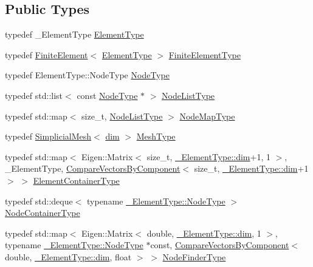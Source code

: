 \subsection*{Public Types}
\begin{DoxyCompactItemize}
\item 
typedef \+\_\+\+Element\+Type \hyperlink{classmodel_1_1_finite_element_ac75db3a0b957c14015dfa8f17ce5b4ac}{Element\+Type}
\item 
typedef \hyperlink{classmodel_1_1_finite_element}{Finite\+Element}$<$ \hyperlink{classmodel_1_1_finite_element_ac75db3a0b957c14015dfa8f17ce5b4ac}{Element\+Type} $>$ \hyperlink{classmodel_1_1_finite_element_a52dc23d4d24a1a38ff0f90d5708c02a8}{Finite\+Element\+Type}
\item 
typedef Element\+Type\+::\+Node\+Type \hyperlink{classmodel_1_1_finite_element_a050ffcafad7f62787f006bae60b7c7be}{Node\+Type}
\item 
typedef std\+::list$<$ const \hyperlink{classmodel_1_1_finite_element_a050ffcafad7f62787f006bae60b7c7be}{Node\+Type} $\ast$ $>$ \hyperlink{classmodel_1_1_finite_element_a7af9e72b3b309eacc0a939b164a67e0e}{Node\+List\+Type}
\item 
typedef std\+::map$<$ size\+\_\+t, \hyperlink{classmodel_1_1_finite_element_a7af9e72b3b309eacc0a939b164a67e0e}{Node\+List\+Type} $>$ \hyperlink{classmodel_1_1_finite_element_a7dc7180abea8b4d87babf0b62dac1ebb}{Node\+Map\+Type}
\item 
typedef \hyperlink{classmodel_1_1_simplicial_mesh}{Simplicial\+Mesh}$<$ \hyperlink{classmodel_1_1_finite_element_a818c65bf8f508c121f1990d430c2b0c0}{dim} $>$ \hyperlink{classmodel_1_1_finite_element_a4651eeb68711db1117585b38b3161042}{Mesh\+Type}
\item 
typedef std\+::map$<$ Eigen\+::\+Matrix$<$ size\+\_\+t, \hyperlink{plot_nd_a_8m_a382f3ca768b275b8d563604f7fc7df73}{\+\_\+\+Element\+Type\+::dim}+1, 1 $>$, \+\_\+\+Element\+Type, \hyperlink{structmodel_1_1_compare_vectors_by_component}{Compare\+Vectors\+By\+Component}$<$ size\+\_\+t, \hyperlink{plot_nd_a_8m_a382f3ca768b275b8d563604f7fc7df73}{\+\_\+\+Element\+Type\+::dim}+1 $>$ $>$ \hyperlink{classmodel_1_1_finite_element_a958802e8fa024898a657ebbe942ef0ba}{Element\+Container\+Type}
\item 
typedef std\+::deque$<$ typename \hyperlink{_network_typedefs_8h_a723f680c66f6a92647827790bcbafce0}{\+\_\+\+Element\+Type\+::\+Node\+Type} $>$ \hyperlink{classmodel_1_1_finite_element_ac66ce55971f21abdbdea01dd7f391c70}{Node\+Container\+Type}
\item 
typedef std\+::map$<$ Eigen\+::\+Matrix$<$ double, \hyperlink{plot_nd_a_8m_a382f3ca768b275b8d563604f7fc7df73}{\+\_\+\+Element\+Type\+::dim}, 1 $>$, typename \hyperlink{_network_typedefs_8h_a723f680c66f6a92647827790bcbafce0}{\+\_\+\+Element\+Type\+::\+Node\+Type} $\ast$const, \hyperlink{structmodel_1_1_compare_vectors_by_component}{Compare\+Vectors\+By\+Component}$<$ double, \hyperlink{plot_nd_a_8m_a382f3ca768b275b8d563604f7fc7df73}{\+\_\+\+Element\+Type\+::dim}, float $>$ $>$ \hyperlink{classmodel_1_1_finite_element_ac8d169f08fe81612ccb6373ea8ce0902}{Node\+Finder\+Type}
\end{DoxyCompactItemize}

